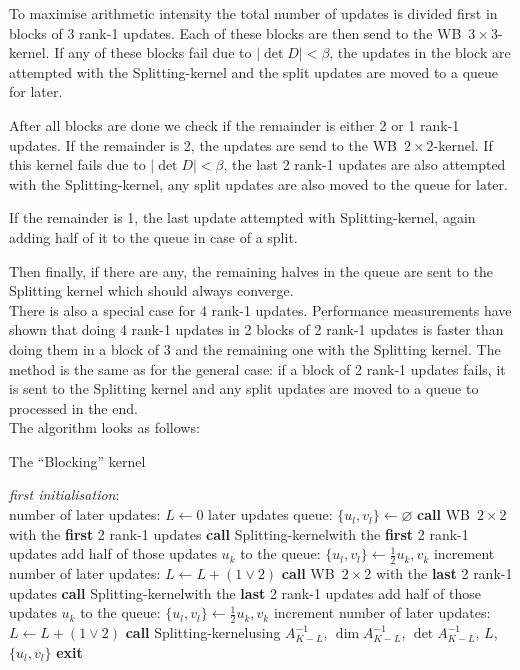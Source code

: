\documentclass[11pt]{article}
\numberwithin{figure}{section}
\numberwithin{table}{section}
\begin{document}
				To maximise arithmetic intensity the total number of updates is divided first in blocks of 3 rank-1 updates. Each of these blocks are then send to the  WB~$3\times 3$-kernel. If any of these blocks fail due to $\left|\det D\right|<\beta$, the updates in the block are attempted with the Splitting-kernel and the split updates are moved to a queue for later.
				
				After all blocks are done we check if the remainder is either 2 or 1 rank-1 updates. If the remainder is 2, the updates are send to the WB~$2\times 2$-kernel. If this kernel fails due to $\left|\det D\right|<\beta$, the last 2 rank-1 updates are also attempted with the Splitting-kernel, any split updates are also moved to the queue for later.
				
				If the remainder is 1, the last update attempted with Splitting-kernel, again adding half of it to the queue in case of a split.
				
				Then finally, if there are any, the remaining halves in the queue are sent to the Splitting kernel which should always converge.\\
				
				There is also a special case for 4 rank-1 updates. Performance measurements have shown that doing 4 rank-1 updates in 2 blocks of 2 rank-1 updates is faster than doing them in a block of 3 and the remaining one with the Splitting kernel. The method is the same as for the general case: if a block of 2 rank-1 updates fails, it is sent to the Splitting kernel and any split updates are moved to a queue to processed in the end.\\
				
				The algorithm looks as follows:\\
				
\begin{algorithm}[h]
	\caption{The ``Blocking'' kernel}\label{algo:blocking}
	\textit{first initialisation}:\\
	number of later updates: $L \gets 0$\;
	later updates queue: $\{u_l, v_l\} \gets \varnothing$\;
	 {
		\textbf{call} WB~$2\times 2$ with the  \textbf{first} 2 rank-1 updates\;
		 {
			\textbf{call} Splitting-kernel\footnotemark[1] with the \textbf{first} 2 rank-1 updates\;
			 {
				add half of those updates $u_k$ to the queue: $\{u_l,v_l\} \gets \frac{1}{2}u_k, v_k$\;
				increment number of later updates: $L \gets L + (1 \lor 2)$\;
			}
		}
		\textbf{call} WB~$2\times 2$ with the \textbf{last} 2 rank-1 updates\;
		 {
			\textbf{call} Splitting-kernel\footnotemark[1] with the \textbf{last} 2 rank-1 updates\;
			 {
				add half of those updates $u_k$ to the queue: $\{u_l,v_l\} \gets \frac{1}{2}u_k, v_k$\;
				increment number of later updates: $L \gets L + (1 \lor 2)$\;
			}
		}
		{
			\textbf{call} Splitting-kernel\footnotemark[2] using $A^{-1}_{K-L}$, $\dim A^{-1}_{K-L}$, $\det A^{-1}_{K-L} $, $L$, $\{u_l, v_l\}$\;
		}
		\textbf{exit}\;
	}
\end{algorithm}
\end{document}
